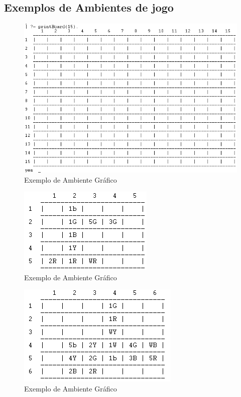 \documentclass[a4paper]{article}
\begin{document}
	\newpage
	\subsection{Exemplos de Ambientes de jogo}
	
	\begin{figure}[h!]
	\begin{center}
	\includegraphics[scale=0.7]{./res/example_1.png}
	\caption{Exemplo de Ambiente Gráfico}
	\label{fig:example1}
	\end{center}
	\end{figure}
	
	\begin{figure}[h!]
	\begin{center}
	\includegraphics[scale=0.7]{./res/example_2.png}
	\caption{Exemplo de Ambiente Gráfico}
	\label{fig:example2}
	\end{center}
	\end{figure}
	
	\begin{figure}[h!]
	\begin{center}
	\includegraphics[scale=0.7]{./res/example_3.png}
	\caption{Exemplo de Ambiente Gráfico}
	\label{fig:example3}
	\end{center}
	\end{figure}
		
	
	
\end{document}
